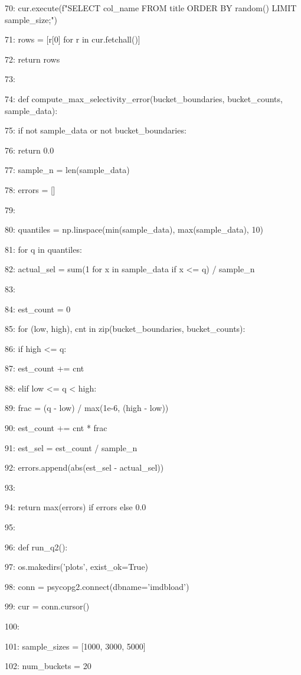 \documentclass[11pt,a4paper]{article}
\begin{document}
70:         cur.execute(f"SELECT {col\_name} FROM title ORDER BY random() LIMIT {sample\_size};")

71:         rows = [r[0] for r in cur.fetchall()]

72:     return rows

73:

74: def compute\_max\_selectivity\_error(bucket\_boundaries, bucket\_counts, sample\_data):

75:     if not sample\_data or not bucket\_boundaries:

76:         return 0.0

77:     sample\_n = len(sample\_data)

78:     errors = []

79:

80:     quantiles = np.linspace(min(sample\_data), max(sample\_data), 10)

81:     for q in quantiles:

82:         actual\_sel = sum(1 for x in sample\_data if x <= q) / sample\_n

83:

84:         est\_count = 0

85:         for (low, high), cnt in zip(bucket\_boundaries, bucket\_counts):

86:             if high <= q:

87:                 est\_count += cnt

88:             elif low <= q < high:

89:                 frac = (q - low) / max(1e-6, (high - low))

90:                 est\_count += cnt * frac

91:         est\_sel = est\_count / sample\_n

92:         errors.append(abs(est\_sel - actual\_sel))

93:

94:     return max(errors) if errors else 0.0

95:

96: def run\_q2():

97:     os.makedirs('plots', exist\_ok=True)

98:     conn = psycopg2.connect(dbname='imdbload')

99:     cur = conn.cursor()

100:

101:     sample\_sizes = [1000, 3000, 5000]

102:     num\_buckets = 20
\end{document}
